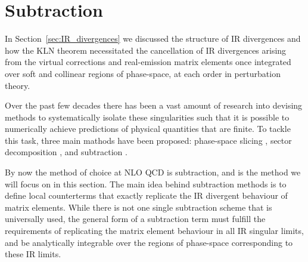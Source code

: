 \documentclass[main.tex]{subfiles}
\begin{document}
\section{Subtraction}\label{sec:subtraction}
    In Section~\ref{sec:IR_divergences} we discussed the
    structure of IR divergences and how the KLN theorem
    necessitated the cancellation of IR divergences 
    arising from the virtual corrections and real-emission
    matrix elements once integrated over soft and collinear
    regions of phase-space, at each order in perturbation
    theory.

    Over the past few decades there has been a vast
    amount of research into devising methods to systematically
    isolate these singularities such that it is possible
    to numerically achieve predictions of physical
    quantities that are finite. To tackle this task, three
    main mathods have been proposed: phase-space slicing \cite{Fabricius:1981sx,Kramer:1986mc,Giele:1991vf},
    sector decomposition \cite{Binoth:2000ps,Binoth:2003ak}, and subtraction \cite{Ellis:1980nc}.
    
    By now the method of choice at NLO QCD is subtraction,
    and is the method we will focus on in this section. The main
    idea behind subtraction methods is to define local counterterms
    that exactly replicate the IR divergent behaviour of matrix
    elements. While there is not one single subtraction scheme
    that is universally used, the general form of a subtraction term
    must fulfill the requirements of replicating the matrix element
    behaviour in all IR singular limits, and be analytically integrable
    over the regions of phase-space corresponding to these IR limits.
\end{document}
